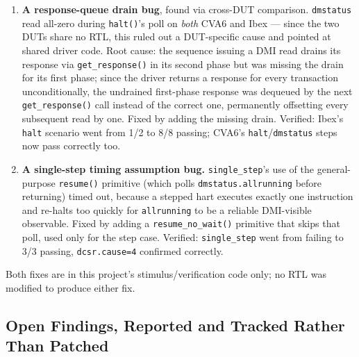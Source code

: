 \documentclass[conference]{IEEEtran}
\begin{document}
\begin{enumerate}
\item \textbf{A response-queue drain bug}, found via cross-DUT comparison. \texttt{dmstatus} read all-zero during \texttt{halt()}'s poll on \textit{both} CVA6 and Ibex --- since the two DUTs share no RTL, this ruled out a DUT-specific cause and pointed at shared driver code. Root cause: the sequence issuing a DMI read drains its response via \texttt{get\_response()} in its second phase but was missing the drain for its first phase; since the driver returns a response for every transaction unconditionally, the undrained first-phase response was dequeued by the next \texttt{get\_response()} call instead of the correct one, permanently offsetting every subsequent read by one. Fixed by adding the missing drain. Verified: Ibex's \texttt{halt} scenario went from 1/2 to 8/8 passing; CVA6's \texttt{halt}/\texttt{dmstatus} steps now pass correctly too.
\item \textbf{A single-step timing assumption bug.} \texttt{single\_step}'s use of the general-purpose \texttt{resume()} primitive (which polls \texttt{dmstatus.allrunning} before returning) timed out, because a stepped hart executes exactly one instruction and re-halts too quickly for \texttt{allrunning} to be a reliable DMI-visible observable. Fixed by adding a \texttt{resume\_no\_wait()} primitive that skips that poll, used only for the step case. Verified: \texttt{single\_step} went from failing to 3/3 passing, \texttt{dcsr.cause=4} confirmed correctly.
\end{enumerate}

Both fixes are in this project's stimulus/verification code only; no RTL was modified to produce either fix.

\subsection{Open Findings, Reported and Tracked Rather Than Patched}
\label{sec:findings}
\end{document}
